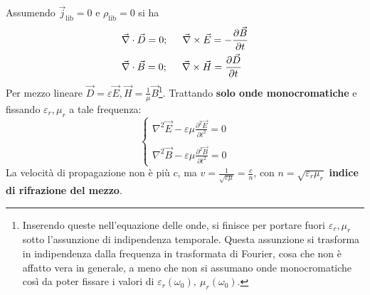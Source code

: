 \documentclass[10pt, a4paper]{scrartcl}
\numberwithin{equation}{subsection}
\theoremstyle{style1}
\begin{document}
Assumendo $\vec{j}_\text{lib}=0$ e $\rho _{\text{lib}} =0$ si ha
\begin{equation}
	\begin{split}
		&\vec{\nabla }\cdot \vec{D}=0;\hspace{.5cm} \vec{\nabla }\times \vec{E}= - \frac{\partial \vec{B}}{\partial t} \\
		&\vec{\nabla }\cdot \vec{B}=0 ;\hspace{.5cm} \vec{\nabla }\times \vec{H}= \frac{\partial \vec{D}}{\partial t} 
	\end{split}
\end{equation}
Per mezzo lineare $\vec{D}=\varepsilon \vec{E}, \vec{H}= \frac{1}{\mu }\vec{B}$\footnote{Inserendo queste nell'equazione delle onde, si finisce per portare fuori $\varepsilon _r, \mu _r$ sotto l'assunzione di indipendenza temporale. Questa assunzione si trasforma in indipendenza dalla frequenza in trasformata di Fourier, cosa che non \`e affatto vera in generale, a meno che non si assumano onde monocromatiche cos\`i da poter fissare i valori di $\varepsilon _r(\omega_0), \ \mu _r(\omega_0)$.}. Trattando \textbf{solo onde monocromatiche} e fissando $\varepsilon _r,\mu _r$ a tale frequenza:
\begin{equation}
	\begin{cases}
		\displaystyle \nabla ^2 \vec{E}-\varepsilon \mu  \frac{\partial ^2 \vec{E}}{\partial t^2} =0 \\
		\\
		\displaystyle \nabla ^2 \vec{B}-\varepsilon \mu \frac{\partial ^2\vec{B}}{\partial t^2} = 0 
	\end{cases}
\end{equation}
La velocit\`a di propagazione non \`e pi\`u $c$, ma $v = \frac{1}{\sqrt{\varepsilon \mu } }= \frac{c}{n}$, con $n=\sqrt{\varepsilon _r\mu _r} $ \textbf{indice di rifrazione del mezzo}.
\end{document}

